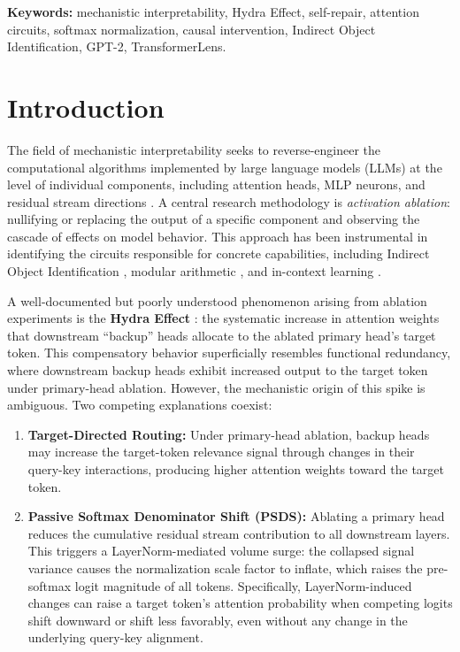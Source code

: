 \documentclass[10pt]{article} %
\begin{document}
\textbf{Keywords:} mechanistic interpretability, Hydra Effect, self-repair,
attention circuits, softmax normalization, causal intervention, Indirect Object
Identification, GPT-2, TransformerLens.

\section{Introduction}
\label{sec:intro}

The field of mechanistic interpretability seeks to reverse-engineer the
computational algorithms implemented by large language models (LLMs) at the
level of individual components, including attention heads, MLP neurons, and residual
stream directions \citep{elhage2021mathematical, olah2020zoom}. A central
research methodology is \emph{activation ablation}: nullifying or replacing the
output of a specific component and observing the cascade of effects on model
behavior. This approach has been instrumental in identifying the circuits
responsible for concrete capabilities, including Indirect Object Identification
\citep{wang2022interpretability}, modular arithmetic \citep{nanda2023progress},
and in-context learning \citep{olsson2022context}.

A well-documented but poorly understood phenomenon arising from ablation
experiments is the \textbf{Hydra Effect} \citep{mcgrath2023hydra}: the
systematic increase in attention weights that downstream ``backup'' heads
allocate to the ablated primary head's target token. This compensatory behavior
superficially resembles functional redundancy, where downstream backup heads exhibit
increased output to the target token under primary-head ablation. However, the mechanistic
origin of this spike is ambiguous.
Two competing explanations coexist:

\begin{enumerate}
  \item \textbf{Target-Directed Routing:} Under primary-head ablation, backup heads may increase the target-token relevance signal through changes in their query-key interactions, producing higher attention weights toward the target token.
  
  \item \textbf{Passive Softmax Denominator Shift (PSDS):} Ablating a primary
    head reduces the cumulative residual stream contribution to all downstream
    layers. This triggers a LayerNorm-mediated volume surge: the collapsed signal
    variance causes the normalization scale factor to inflate, which raises the
    pre-softmax logit magnitude of all tokens. Specifically, LayerNorm-induced changes can raise a target token's attention probability when competing logits shift downward or shift less favorably, even without any change in the underlying query-key alignment.
\end{enumerate}
\end{document}
